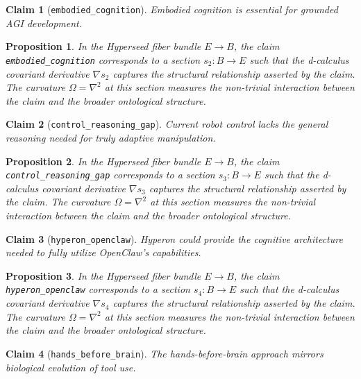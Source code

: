 \documentclass{article}
\newtheorem{claim}{Claim}
\newtheorem{proposition}{Proposition}
\begin{document}
\begin{claim}[\texttt{embodied_cognition}]
Embodied cognition is essential for grounded AGI development.
\end{claim}

\begin{proposition}
In the Hyperseed fiber bundle $E \to B$, the claim \texttt{embodied_cognition} corresponds to a section $s_2: B \to E$ such that the d-calculus covariant derivative $\nabla s_2$ captures the structural relationship asserted by the claim. The curvature $\Omega = \nabla^2$ at this section measures the non-trivial interaction between the claim and the broader ontological structure.
\end{proposition}

\begin{claim}[\texttt{control_reasoning_gap}]
Current robot control lacks the general reasoning needed for truly adaptive manipulation.
\end{claim}

\begin{proposition}
In the Hyperseed fiber bundle $E \to B$, the claim \texttt{control_reasoning_gap} corresponds to a section $s_3: B \to E$ such that the d-calculus covariant derivative $\nabla s_3$ captures the structural relationship asserted by the claim. The curvature $\Omega = \nabla^2$ at this section measures the non-trivial interaction between the claim and the broader ontological structure.
\end{proposition}

\begin{claim}[\texttt{hyperon_openclaw}]
Hyperon could provide the cognitive architecture needed to fully utilize OpenClaw's capabilities.
\end{claim}

\begin{proposition}
In the Hyperseed fiber bundle $E \to B$, the claim \texttt{hyperon_openclaw} corresponds to a section $s_4: B \to E$ such that the d-calculus covariant derivative $\nabla s_4$ captures the structural relationship asserted by the claim. The curvature $\Omega = \nabla^2$ at this section measures the non-trivial interaction between the claim and the broader ontological structure.
\end{proposition}

\begin{claim}[\texttt{hands_before_brain}]
The hands-before-brain approach mirrors biological evolution of tool use.
\end{claim}
\end{document}

